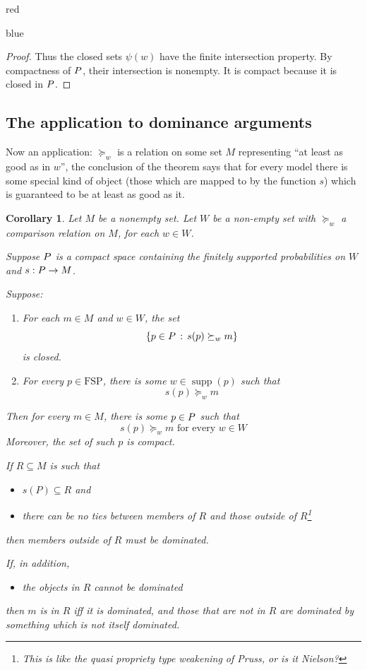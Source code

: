 \documentclass[11pt]{article}
\newtheorem{corollary}[theorem]{Corollary}
\theoremstyle{definition}
\theoremstyle{remark}
\newcommand{\supp}{\operatorname{supp}}
\newcommand{\given}{\,:\,}
\newcommand{\FSP}{\mathrm{FSP}}
\newenvironment{AIwritten}{\begin{color}{blue}}{\end{color}}
\begin{document}
\begin{color}{red}
\begin{AIwritten}
\begin{proof}
		Thus the closed sets $\psi(w)$ have the finite intersection
		property. By compactness of $P$, their intersection is
		nonempty. It is compact because it is closed in $P$.
	\end{proof}
	
\end{AIwritten}
\subsection{The application to dominance arguments}
Now an application: 
$\succeq_w$ is a relation on some set $M$ representing  ``at least as good as in $w$'', 
the conclusion of the theorem says that for every model there is some special kind of object (those which are mapped to by the function $s$) which is guaranteed to be at least as good as it. 

\begin{corollary}
	Let $M$ be a nonempty set. 
	Let $W$ be a non-empty set with $\succeq_w$ a comparison relation on $M$, for each $w\in W$. 
	
	Suppose $P$ is a compact space
	containing the finitely supported probabilities on $W$ and $s:P\to M$. 
	
	Suppose: 
	\begin{enumerate}
		\item For each $m\in M$ and $w\in W$, the set \[\{p\in \Probs\given s(p)\succeq_w m\}\] is closed.
		\item For every $p\in\FSP$, there is some $w\in\supp(p)$ such that $$s(p)\succeq_w m$$
	\end{enumerate}
	Then for every $m\in M$, there is some $p\in P$ such that 
		\[
		s(p)\succeq_w m
		\text{ for every }w\in W
		\] Moreover, the set of such $p$ is compact. 
		


	If $R\subseteq M$ is such that \begin{itemize}
		\item $s(P)\subseteq R$ and
		\item  there can be no ties between members of $R$ and those outside of $R$\footnote{This is like the quasi propriety type weakening of Pruss, or is it Nielson?} 
	\end{itemize}then members outside of $R$ must be dominated. 
	
	If, in addition, \begin{itemize}
		\item the objects in $R$ cannot be dominated
	\end{itemize} then $m$ is in $R$ iff it is dominated, and those that are not in $R$ are dominated by something which is not itself dominated. 
\end{corollary}


\end{color}
\end{document}
